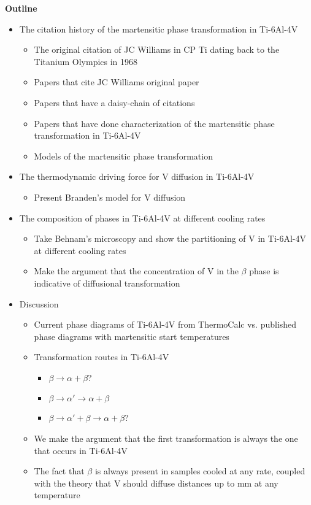 \documentclass[nofootinbib,notitlepage]{revtex4-1}
\begin{document}
\textbf{Outline}
\begin{itemize}
	\item The citation history of the martensitic phase transformation in Ti-6Al-4V \begin{itemize}
		\item The original citation of JC Williams in CP Ti dating back to the Titanium Olympics in 1968
		\item Papers that cite JC Williams original paper
		\item Papers that have a daisy-chain of citations 
		\item Papers that have done characterization of the martensitic phase transformation in Ti-6Al-4V
		\item Models of the martensitic phase transformation
		\end{itemize}
	\item The thermodynamic driving force for V diffusion in Ti-6Al-4V \begin{itemize}
		\item Present Branden's model for V diffusion
		\end{itemize}
	\item The composition of phases in Ti-6Al-4V at different cooling rates \begin{itemize}
		\item Take Behnam's microscopy and show the partitioning of V in Ti-6Al-4V at different cooling rates
		\item Make the argument that the concentration of V in the $\beta$ phase is indicative of diffusional transformation
		\end{itemize}
	\item Discussion \begin{itemize}
		\item Current phase diagrams of Ti-6Al-4V from ThermoCalc vs. published phase diagrams with martensitic start temperatures
		\item Transformation routes in Ti-6Al-4V \begin{itemize}
			\item $\beta \to \alpha + \beta$?
			\item $\beta \to \alpha' \to \alpha + \beta$
			\item $\beta \to \alpha' + \beta \to \alpha + \beta$?
			\end{itemize}
		\item We make the argument that the first transformation is always the one that occurs in Ti-6Al-4V
		\item The fact that $\beta$ is always present in samples cooled at any rate, coupled with the theory that V should diffuse distances up to mm at any temperature
		\end{itemize}
\end{itemize}
\end{document}
